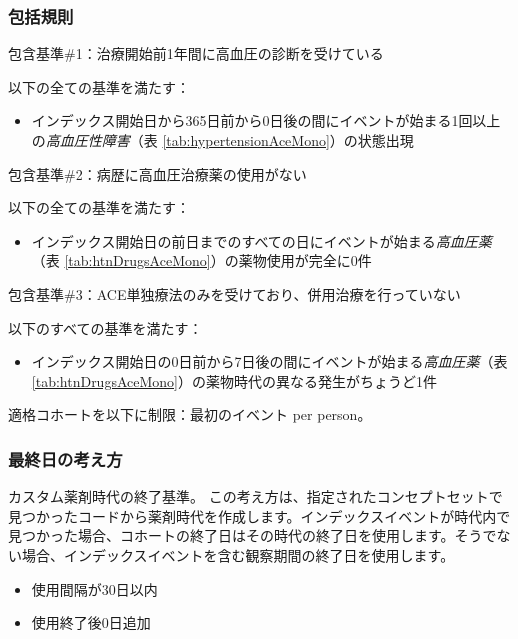 \documentclass[
  11pt]{book}
\providecommand{\tightlist}{%
  \setlength{\itemsep}{0pt}\setlength{\parskip}{0pt}}
\theoremstyle{definition}
\theoremstyle{definition}
\theoremstyle{definition}
\theoremstyle{definition}
\theoremstyle{remark}
\begin{document}
\subsubsection*{包括規則}\label{ux5305ux62ecux898fux5247}

包含基準\#1：治療開始前1年間に高血圧の診断を受けている

以下の全ての基準を満たす：

\begin{itemize}
\tightlist
\item
  インデックス開始日から365日前から0日後の間にイベントが始まる1回以上の\emph{高血圧性障害}（表 \ref{tab:hypertensionAceMono}）の状態出現
\end{itemize}

包含基準\#2：病歴に高血圧治療薬の使用がない

以下の全ての基準を満たす：

\begin{itemize}
\tightlist
\item
  インデックス開始日の前日までのすべての日にイベントが始まる\emph{高血圧薬}（表 \ref{tab:htnDrugsAceMono}）の薬物使用が完全に0件
\end{itemize}

包含基準\#3：ACE単独療法のみを受けており、併用治療を行っていない

以下のすべての基準を満たす：

\begin{itemize}
\tightlist
\item
  インデックス開始日の0日前から7日後の間にイベントが始まる\emph{高血圧薬}（表 \ref{tab:htnDrugsAceMono}）の薬物時代の異なる発生がちょうど1件
\end{itemize}

適格コホートを以下に制限：最初のイベント per person。

\subsubsection*{最終日の考え方}\label{ux6700ux7d42ux65e5ux306eux8003ux3048ux65b9}

カスタム薬剤時代の終了基準。
この考え方は、指定されたコンセプトセットで見つかったコードから薬剤時代を作成します。インデックスイベントが時代内で見つかった場合、コホートの終了日はその時代の終了日を使用します。そうでない場合、インデックスイベントを含む観察期間の終了日を使用します。

\begin{itemize}
\tightlist
\item
  使用間隔が30日以内
\item
  使用終了後0日追加
\end{itemize}
\end{document}
